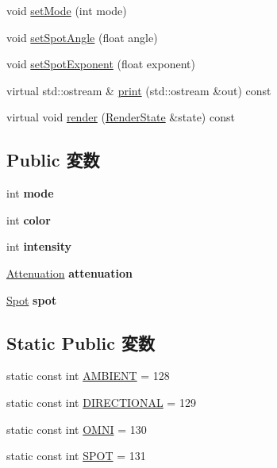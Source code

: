\begin{CompactItemize}
\item 
void \hyperlink{classm3g_1_1Light_9f407b18ba6235cb96fa95611c1ea3a4}{setMode} (int mode)
\item 
void \hyperlink{classm3g_1_1Light_30ce206b37f6ed5e918fbc75b3f91072}{setSpotAngle} (float angle)
\item 
void \hyperlink{classm3g_1_1Light_787eb66801e17d0412559598326ce19d}{setSpotExponent} (float exponent)
\item 
virtual std::ostream \& \hyperlink{classm3g_1_1Light_6fea17fa1532df3794f8cb39cb4f911f}{print} (std::ostream \&out) const 
\item 
virtual void \hyperlink{classm3g_1_1Light_8babc8a79b78615da51161e94029eea9}{render} (\hyperlink{structm3g_1_1RenderState}{RenderState} \&state) const 
\end{CompactItemize}
\subsection*{Public 変数}
\begin{CompactItemize}
\item 
\hypertarget{classm3g_1_1Light_1ea5d0cb93f22f7d0fdf804bd68c3326}{
int \textbf{mode}}
\label{classm3g_1_1Light_1ea5d0cb93f22f7d0fdf804bd68c3326}

\item 
\hypertarget{classm3g_1_1Light_0fd02fb9277ffcb35a75066ffe95e8c7}{
int \textbf{color}}
\label{classm3g_1_1Light_0fd02fb9277ffcb35a75066ffe95e8c7}

\item 
\hypertarget{classm3g_1_1Light_299ec0c42ccc5a2d79d1739428ac3210}{
int \textbf{intensity}}
\label{classm3g_1_1Light_299ec0c42ccc5a2d79d1739428ac3210}

\item 
\hypertarget{classm3g_1_1Light_1569207c73e72f9b3ceeaba71b985378}{
\hyperlink{structm3g_1_1Light_1_1Attenuation}{Attenuation} \textbf{attenuation}}
\label{classm3g_1_1Light_1569207c73e72f9b3ceeaba71b985378}

\item 
\hypertarget{classm3g_1_1Light_8c48692471265603559309c9b2fd65a1}{
\hyperlink{structm3g_1_1Light_1_1Spot}{Spot} \textbf{spot}}
\label{classm3g_1_1Light_8c48692471265603559309c9b2fd65a1}

\end{CompactItemize}
\subsection*{Static Public 変数}
\begin{CompactItemize}
\item 
static const int \hyperlink{classm3g_1_1Light_4cf648a82d9de62a1fb15f4277049594}{AMBIENT} = 128
\item 
static const int \hyperlink{classm3g_1_1Light_a2fb668ca8bbeb8323eda98fba594fda}{DIRECTIONAL} = 129
\item 
static const int \hyperlink{classm3g_1_1Light_34d360bb8395ad7fbcd3ec286ece64cb}{OMNI} = 130
\item 
static const int \hyperlink{classm3g_1_1Light_c44aef16b96dc8fd8b134416964a7de9}{SPOT} = 131
\end{CompactItemize}
